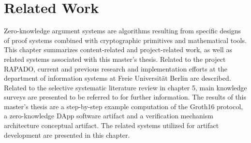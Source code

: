 \chapter{Related Work}
Zero-knowledge argument systems are algorithms resulting from specific designs of proof systems combined with cryptographic primitives and mathematical tools. This chapter summarizes content-related and project-related work, as well as related systems associated with this master's thesis. Related to the project RAPADO, current and previous research and implementation efforts at the department of information systems at Freie Universit{\"a}t Berlin are described. Related to the selective systematic literature review in chapter 5, main knowledge surveys are presented to be referred to for further information. The results of this master's thesis are a step-by-step example computation of the Groth16 protocol, a zero-knowledge DApp software artifact and a verification mechanism architecture conceptual artifact. The related systems utilized for artifact development are presented in this chapter.

